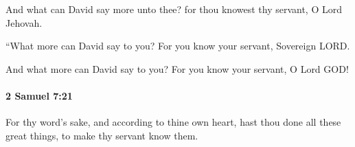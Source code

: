 			\begin{versebox}
					\item[BHS] 
					\item[ASV] And what can David say more unto thee? for thou knowest thy servant, O Lord Jehovah.
					\item[NIV] “What more can David say to you? For you know your servant, Sovereign LORD.
					\item[NRSV] And what more can David say to you? For you know your servant, O Lord GOD!
			\end{versebox}

		\paragraph{2 Samuel 7:21} %
			\label{2SAMUEL-7-21}

			For thy word’s sake, and according to thine own heart, hast thou done all these great things, to make thy servant know them.

